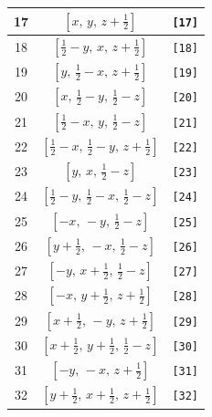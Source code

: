 \documentclass[fleqn,8pt]{jsarticle}
\begin{document}
\begin{longtable}{ccc}
17 & $\left[ x,\, y,\, z + \frac{1}{2} \right]$ & {\tt [17]} \\ \hline
18 & $\left[ \frac{1}{2} - y,\, x,\, z + \frac{1}{2} \right]$ & {\tt [18]} \\ \hline
19 & $\left[ y,\, \frac{1}{2} - x,\, z + \frac{1}{2} \right]$ & {\tt [19]} \\ \hline
20 & $\left[ x,\, \frac{1}{2} - y,\, \frac{1}{2} - z \right]$ & {\tt [20]} \\ \hline
21 & $\left[ \frac{1}{2} - x,\, y,\, \frac{1}{2} - z \right]$ & {\tt [21]} \\ \hline
22 & $\left[ \frac{1}{2} - x,\, \frac{1}{2} - y,\, z + \frac{1}{2} \right]$ & {\tt [22]} \\ \hline
23 & $\left[ y,\, x,\, \frac{1}{2} - z \right]$ & {\tt [23]} \\ \hline
24 & $\left[ \frac{1}{2} - y,\, \frac{1}{2} - x,\, \frac{1}{2} - z \right]$ & {\tt [24]} \\ \hline
25 & $\left[ - x,\, - y,\, \frac{1}{2} - z \right]$ & {\tt [25]} \\ \hline
26 & $\left[ y + \frac{1}{2},\, - x,\, \frac{1}{2} - z \right]$ & {\tt [26]} \\ \hline
27 & $\left[ - y,\, x + \frac{1}{2},\, \frac{1}{2} - z \right]$ & {\tt [27]} \\ \hline
28 & $\left[ - x,\, y + \frac{1}{2},\, z + \frac{1}{2} \right]$ & {\tt [28]} \\ \hline
29 & $\left[ x + \frac{1}{2},\, - y,\, z + \frac{1}{2} \right]$ & {\tt [29]} \\ \hline
30 & $\left[ x + \frac{1}{2},\, y + \frac{1}{2},\, \frac{1}{2} - z \right]$ & {\tt [30]} \\ \hline
31 & $\left[ - y,\, - x,\, z + \frac{1}{2} \right]$ & {\tt [31]} \\ \hline
32 & $\left[ y + \frac{1}{2},\, x + \frac{1}{2},\, z + \frac{1}{2} \right]$ & {\tt [32]} \\
\end{longtable}
\end{document}
